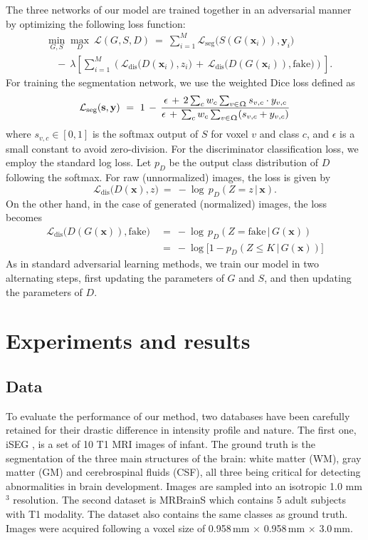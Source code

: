 \documentclass{article}
\renewcommand{\vec}[1]{\mathbf{#1}}
\newcommand{\mr}[1]{\mathrm{#1}}
\newcommand{\yy}{\vec{y}}
\newcommand{\xx}{\vec{x}}
\newcommand{\sss}{\vec{s}}
\newcommand{\loss}{\mathcal{L}}
\newcommand{\lossSeg}{\loss_{\mr{seg}}}
\newcommand{\lossDis}{\loss_{\mr{dis}}}
\newcommand{\img}{\Upomega}
\begin{document}
The three networks of our model are trained together in an adversarial manner by optimizing the following loss function:
\begin{align}\label{eq:total_loss}
& \min_{G,S} \max_{D} \ \loss(G, S, D) \ = \ \sum_{i=1}^{M} \lossSeg \big(S(G(\xx_i)), \yy_i\big)  \\[-1mm]
& \quad - \ \lambda\left[\sum_{i=1}^{M} \left( \lossDis\big(D(\xx_i), z_i\big) \, + \, \lossDis\big(D(G(\xx_i)), \mr{fake}\big)\right )\right]\nonumber. %
\end{align}
For training the segmentation network, we use the weighted Dice loss defined as
\begin{equation}
\lossSeg(\sss,\yy) \ = \ 1 \, - \, \frac{\epsilon \, + \, 2 \sum_{c} w_c \sum_{v \in \img} s_{v,c} \cdot y_{v,c}}{\epsilon \, + \, \sum_{c} w_c \sum_{v \in \img} (s_{v,c} +  y_{v,c})}
\end{equation}
where $s_{v,c} \in [0, 1]$ is the softmax output of $S$ for voxel $v$ and class $c$, and $\epsilon$ is a small constant to avoid zero-division. For the discriminator classification loss, we employ the standard log loss. Let $p_D$ be the output class distribution of $D$ following the softmax. For raw (unnormalized) images, the loss is given by
\begin{equation}
    \lossDis\big(D(\xx), z\big) \ = \ - \log \, p_D(Z = z \, | \, \xx).
\end{equation}
On the other hand, in the case of generated (normalized) images, the loss becomes
\begin{align}
    \lossDis\big(D(G(\xx)), \mr{fake}\big) & \ = \
        - \log \, p_D(Z = \mr{fake} \, | \, G(\xx)) \\
        & \ = \ - \log \big[1 - p_D(Z \leq K \, | \, G(\xx))\big]\nonumber
\end{align}
As in standard adversarial learning methods, we train our model in two alternating steps, first updating the parameters of $G$ and $S$, and then updating the parameters of $D$.



\section{Experiments and results}
\label{sec:pagestyle}

\subsection{Data}
To evaluate the performance of our method, two databases have been carefully retained for their drastic difference in intensity profile and nature. The first one, iSEG \cite{Wang2019}, is a set of 10 T1 MRI images of infant. The ground truth is the segmentation of the three main structures of the brain: white matter (WM), gray matter (GM) and cerebrospinal fluids (CSF), all three being critical for detecting abnormalities in brain development. Images are sampled into an isotropic 1.0 mm$^3$ resolution.
%
The second dataset is MRBrainS \cite{Mendrik2015} which contains 5 adult subjects with T1 modality. The dataset also contains the same classes as ground truth. Images were acquired following a voxel size of 0.958\,mm $\times$ 0.958\,mm $\times$ 3.0\,mm.
\end{document}
